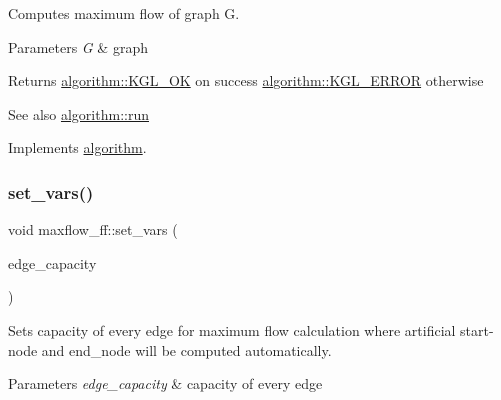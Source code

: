 Computes maximum flow of graph {\ttfamily G}.


\begin{DoxyParams}{Parameters}
{\em G} & graph \\
\hline
\end{DoxyParams}
\begin{DoxyReturn}{Returns}
{\ttfamily \mbox{\hyperlink{classalgorithm_af1a0078e153aa99c24f9bdf0d97f6710aae4c1cd7fe8d8cf4b143241a6e7c31cf}{algorithm\+::\+K\+G\+L\+\_\+\+OK}}} on success {\ttfamily \mbox{\hyperlink{classalgorithm_af1a0078e153aa99c24f9bdf0d97f6710ae67bf27b2ef31f73e545a7f9f4a69556}{algorithm\+::\+K\+G\+L\+\_\+\+E\+R\+R\+OR}}} otherwise 
\end{DoxyReturn}
\begin{DoxySeeAlso}{See also}
\mbox{\hyperlink{classalgorithm_a482eb28cacba018b5a86d3a819a50a2f}{algorithm\+::run}} 
\end{DoxySeeAlso}


Implements \mbox{\hyperlink{classalgorithm_a482eb28cacba018b5a86d3a819a50a2f}{algorithm}}.

\mbox{\label{classmaxflow__ff_ad2485a4c093dbcfa045d1e6e5d78f533}} 
\subsubsection{\texorpdfstring{set\+\_\+vars()}{set\_vars()}\hspace{0.1cm}{\footnotesize\ttfamily [1/2]}}
{\footnotesize\ttfamily void maxflow\+\_\+ff\+::set\+\_\+vars (\begin{DoxyParamCaption}\item[{const \mbox{\hyperlink{classedge__map}{edge\+\_\+map}}$<$ double $>$ \&}]{edge\+\_\+capacity }\end{DoxyParamCaption})}

Sets capacity of every edge for maximum flow calculation where artificial start-\/node and end\+\_\+node will be computed automatically.


\begin{DoxyParams}{Parameters}
{\em edge\+\_\+capacity} & capacity of every edge \\
\hline
\end{DoxyParams}
\mbox{\label{classmaxflow__ff_a1e715030d70080e0c9ecf118dd81e8f6}} 
